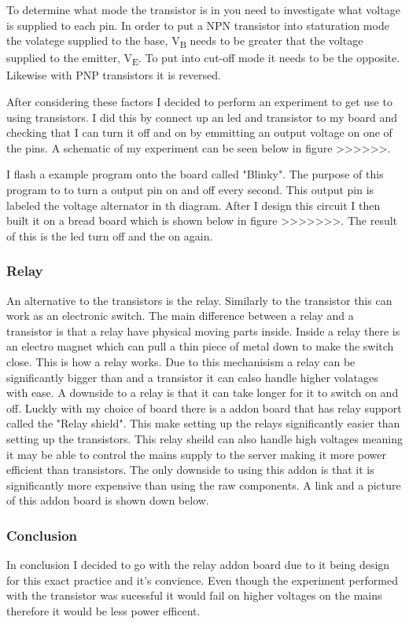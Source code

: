 \documentclass{article}
\begin{document}
To determine what mode the transistor is in you need to investigate what voltage is supplied to each pin.
In order to put a NPN transistor into staturation mode the volatege supplied to the base, V\textsubscript{B}
needs to be greater that the voltage supplied to the emitter, V\textsubscript{E}. To put into cut-off mode
it needs to be the opposite. Likewise with PNP transistors it is reversed.

After considering these factors I decided to perform an experiment to get use to using transistors. I did
this by connect up an led and transistor to my board and checking that I can turn it off and on by emmitting
an output voltage on one of the pins. A schematic of my experiment can be seen below in figure >>>>>>.



I flash a example program onto the board called "Blinky". The purpose of this program to to turn a output
pin on and off every second. This output pin is labeled the voltage alternator in th diagram. After I
design this circuit I then built it on a bread board which is shown below in figure >>>>>>>. The result
of this is the led turn off and the on again.

\subsubsection{Relay}

An alternative to the transistors is the relay. Similarly to the transistor this can work as an electronic
switch. The main difference between a relay and a transistor is that a relay have physical moving parts
inside. Inside a relay there is an electro magnet which can pull a thin piece of metal down to make the 
switch close. This is how a relay works. Due to this mechanisism a relay can be significantly bigger than
and a transistor it can calso handle higher volatages with ease. A downside to a relay is that it can
take longer for it to switch on and off. Luckly with my choice of board there is a addon board that has
relay support called the "Relay shield". This make setting up the relays significantly easier than setting
up the transistors. This relay sheild can also handle high voltages meaning it may be able to control the
mains supply to the server making it more power efficient than transistors. The only downside to using this
addon is that it is significantly more expensive than using the raw components. A link and a picture of this
addon board is shown down below.

\subsubsection{Conclusion}
In conclusion I decided to go with the relay addon board due to it being design for this exact practice and
it's convience. Even though the experiment performed with the transistor was sucessful it would fail on
higher voltages on the mains therefore it would be less power efficent.
\end{document}
